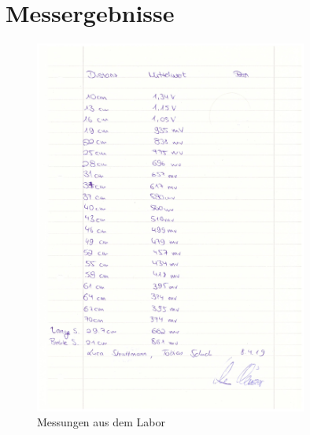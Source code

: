 \documentclass[12pt, oneside, a4paper, \docLanguage]{report}
\begin{document}
\section{Messergebnisse}
\label{chap:APPENDIX_MEASUREMENT_SOURCE}
\begin{figure}[hbt!]
	\centering\small
	\includegraphics[width=0.8\textwidth]{media/scan.png}
	\caption{Messungen aus dem Labor}
	\label{fig:Messungen aus dem Labor}
\end{figure}

%
%
\addtocounter{chapter}{1}
\setcounter{section}{1}


\end{document}

